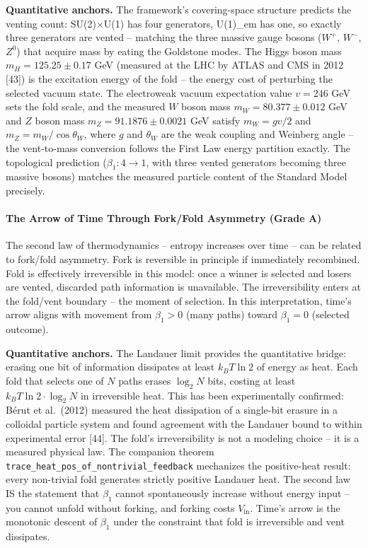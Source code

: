 \documentclass[
  11pt,
]{article}
\begin{document}
\textbf{Quantitative anchors.} The framework's covering-space structure
predicts the venting count: SU(2)×U(1) has four generators, U(1)\_em has
one, so exactly three generators are vented -- matching the three
massive gauge bosons (\(W^+\), \(W^-\), \(Z^0\)) that acquire mass by
eating the Goldstone modes. The Higgs boson mass
\(m_H = 125.25 \pm 0.17\) GeV (measured at the LHC by ATLAS and CMS in
2012 {[}43{]}) is the excitation energy of the fold -- the energy cost
of perturbing the selected vacuum state. The electroweak vacuum
expectation value \(v = 246\) GeV sets the fold scale, and the measured
\(W\) boson mass \(m_W = 80.377 \pm 0.012\) GeV and \(Z\) boson mass
\(m_Z = 91.1876 \pm 0.0021\) GeV satisfy \(m_W = gv/2\) and
\(m_Z = m_W / \cos\theta_W\), where \(g\) and \(\theta_W\) are the weak
coupling and Weinberg angle -- the vent-to-mass conversion follows the
First Law energy partition exactly. The topological prediction
(\(\beta_1: 4 \to 1\), with three vented generators becoming three
massive bosons) matches the measured particle content of the Standard
Model precisely.

\paragraph{The Arrow of Time Through Fork/Fold Asymmetry (Grade
A)}\label{the-arrow-of-time-through-forkfold-asymmetry-grade-a}

The second law of thermodynamics -- entropy increases over time -- can
be related to fork/fold asymmetry. Fork is reversible in principle if
immediately recombined. Fold is effectively irreversible in this model:
once a winner is selected and losers are vented, discarded path
information is unavailable. The irreversibility enters at the fold/vent
boundary -- the moment of selection. In this interpretation, time's
arrow aligns with movement from \(\beta_1 > 0\) (many paths) toward
\(\beta_1 = 0\) (selected outcome).

\textbf{Quantitative anchors.} The Landauer limit provides the
quantitative bridge: erasing one bit of information dissipates at least
\(k_B T \ln 2\) of energy as heat. Each fold that selects one of \(N\)
paths erases \(\log_2 N\) bits, costing at least
\(k_B T \ln 2 \cdot \log_2 N\) in irreversible heat. This has been
experimentally confirmed: Bérut et al.~(2012) measured the heat
dissipation of a single-bit erasure in a colloidal particle system and
found agreement with the Landauer bound to within experimental error
{[}44{]}. The fold's irreversibility is not a modeling choice -- it is a
measured physical law. The companion theorem
\texttt{trace\_heat\_pos\_of\_nontrivial\_feedback} mechanizes the
positive-heat result: every non-trivial fold generates strictly positive
Landauer heat. The second law IS the statement that \(\beta_1\) cannot
spontaneously increase without energy input -- you cannot unfold without
forking, and forking costs \(V_{\text{in}}\). Time's arrow is the
monotonic descent of \(\beta_1\) under the constraint that fold is
irreversible and vent dissipates.
\end{document}
